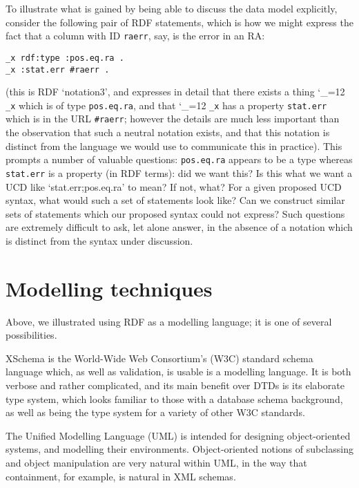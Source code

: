 \documentclass[11pt,twoside]{article}
\begin{document}
To illustrate what is gained by being able to discuss the data model
explicitly, consider the following pair of RDF statements, which is
how we might express the fact that a column with ID \texttt{raerr},
say, is the error in an RA:
\begin{verbatim}
_x rdf:type :pos.eq.ra .
_x :stat.err #raerr .
\end{verbatim}
(this is RDF `notation3', and expresses in detail that there
exists a thing
{\catcode`\_=12 \texttt{_x}} %
which is of type \texttt{pos.eq.ra}, and that
{\catcode`\_=12 \texttt{_x}}
has a property \texttt{stat.err} which is in the URL
\texttt{\#raerr}; however the details are much less important than the
observation that such a neutral notation exists, and that this 
notation is distinct from the language we would use to communicate
this in practice).
%
This prompts a number of valuable questions: \texttt{pos.eq.ra}
appears to be a type whereas \texttt{stat.err} is a property (in RDF
terms): did we want this?  Is this what we want a UCD like
`stat.err;pos.eq.ra' to mean?  If not, what?  For a given proposed UCD
syntax, what would such a set of statements look like?  Can we
construct similar sets of statements which our proposed syntax could
not express?  Such questions are extremely difficult to ask, let alone
answer, in the
absence of a notation which is distinct from the syntax under
discussion.


\section{Modelling techniques\label{s:techniques}}

Above, we illustrated using RDF as a modelling language; it is one of
several possibilities.

XSchema is the World-Wide Web Consortium's (W3C) standard schema
language which, as well as validation, is usable is a modelling
language.  It is both verbose and rather complicated, and its main
benefit over DTDs is its elaborate type system, which looks familiar
to those with a database schema background, as well as being the type
system for a variety of other W3C standards.

The Unified Modelling Language (UML) is intended for designing
object-oriented systems, and modelling their environments.
Object-oriented notions of subclassing and object manipulation are
very natural within UML, in the way that containment, for example, is
natural in XML schemas.
\end{document}
